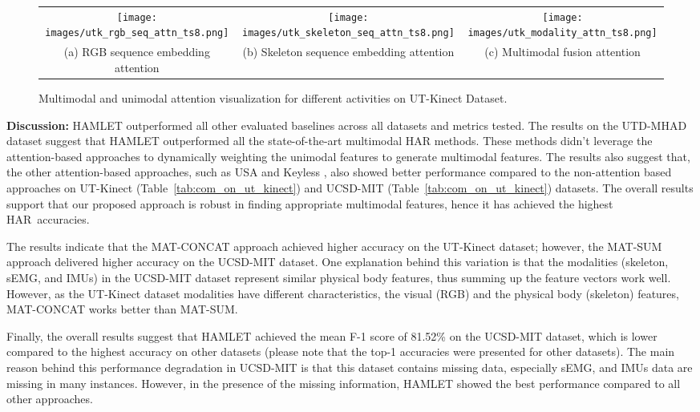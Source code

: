\documentclass[runningheads]{llncs}
\newcommand{\pa}{HAMLET}
\begin{document}
\begin{figure*}[!t]
  \centering
  \begin{tabular}{*{3}{c}}
    \texttt{[image: images/utk\_rgb\_seq\_attn\_ts8.png]} &
    \texttt{[image: images/utk\_skeleton\_seq\_attn\_ts8.png]} & \texttt{[image: images/utk\_modality\_attn\_ts8.png]} \\
    \footnotesize{(a) RGB sequence embedding attention} & \footnotesize{(b) Skeleton sequence embedding attention} & \footnotesize{(c) Multimodal fusion attention} \\
  \end{tabular}
  \caption{Multimodal and unimodal attention visualization for different activities on UT-Kinect Dataset.}
  \label{fig:vis_attention}
\end{figure*}




{\textbf{Discussion:}} {\pa } outperformed all other evaluated baselines across all datasets and metrics tested. The results on the UTD-MHAD dataset suggest that {\pa } outperformed all the state-of-the-art multimodal HAR methods. These methods didn't leverage the attention-based approaches to dynamically weighting the unimodal features to generate multimodal features. The results also suggest that, the other attention-based approaches, such as USA and Keyless \cite{keyless}, also showed better performance compared to the non-attention based approaches on UT-Kinect (Table~\ref{tab:com_on_ut_kinect}) and UCSD-MIT (Table~\ref{tab:com_on_ut_kinect}) datasets. The overall results support that our proposed approach is robust in finding appropriate multimodal features, hence it has achieved the highest HAR~accuracies.    


\par The results indicate that the MAT-CONCAT approach achieved higher accuracy on the UT-Kinect dataset; however, the MAT-SUM approach delivered higher accuracy on the UCSD-MIT dataset. One explanation behind this variation is that the modalities (skeleton, sEMG, and IMUs) in the UCSD-MIT dataset represent similar physical body features, thus summing up the feature vectors work well. However, as the UT-Kinect dataset modalities have different characteristics, the visual (RGB) and the physical body (skeleton) features, MAT-CONCAT works better than MAT-SUM.

\par Finally, the overall results suggest that {\pa} achieved the mean F-1 score of 81.52\% on the UCSD-MIT dataset, which is lower compared to the highest accuracy on other datasets (please note that the top-1 accuracies were presented for other datasets). The main reason behind this performance degradation in UCSD-MIT is that this dataset contains missing data, especially sEMG, and IMUs data are missing in many instances. However, in the presence of the missing information, {\pa } showed the best performance compared to all other approaches.
\end{document}
